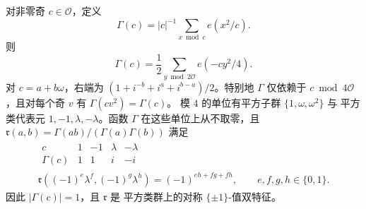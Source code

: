 \begin{lemma}[二次四项公式]\label{lem:quadratic-four-term}
对非零奇 $c\in\mathcal O$，定义
\[
 \Gamma(c)=|c|^{-1}\sum_{x\bmod c}e(x^2/c).
\]
则
\begin{equation}\label{eq:quadratic-four-term}
 \Gamma(c)=\frac12\sum_{y\bmod2\mathcal O}e(-cy^2/4).
\end{equation}
对 $c=a+b\omega$，右端为
$(1+i^{-b}+i^a+i^{b-a})/2$。特别地 $\Gamma$ 仅依赖于
$c\bmod4\mathcal O$，且对每个奇 $v$ 有 $\Gamma(cv^2)=\Gamma(c)$。
模 $4$ 的单位有平方子群 $\{1,\omega,\omega^2\}$ 与
平方类代表元 $1,-1,\lambda,-\lambda$。函数
$\Gamma$ 在这些单位上从不取零，且
$\mathfrak r(a,b)=\Gamma(ab)/(\Gamma(a)\Gamma(b))$ 满足
\begin{equation}\label{eq:reciprocity-four-class}
 \begin{gathered}
 \begin{array}{c|rrrr}
  c&1&-1&\lambda&-\lambda\\ \hline
  \Gamma(c)&1&1&i&-i
 \end{array}\\
 \mathfrak r((-1)^e\lambda^f,(-1)^g\lambda^h)
       =(-1)^{eh+fg+fh},\qquad e,f,g,h\in\{0,1\}.
 \end{gathered}
\end{equation}
因此 $|\Gamma(c)|=1$，且 $\mathfrak r$ 是
平方类群上的对称 $\{\pm1\}$-值双特征。
\end{lemma}

